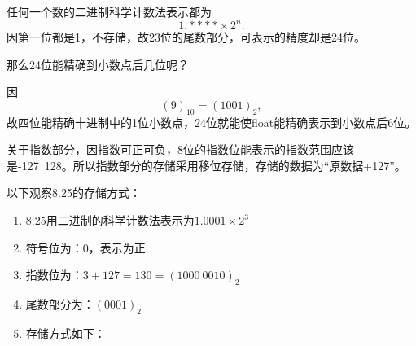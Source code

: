 %
\begin{frame}
\textcolor{acolor5}{任何一个数的二进制科学计数法表示都为
$$
1.****\times 2^n.
$$
因第一位都是1，不存储，故23位的尾数部分，可表示的精度却是24位。 
} 
\end{frame}
%
\begin{frame}
 
\begin{wenti}
那么24位能精确到小数点后几位呢？ 
\end{wenti}
因$$
(9)_{10}=(1001)_2,
$$
故四位能精确十进制中的1位小数点，24位就能使float能精确表示到小数点后6位。
\end{frame}
%
\begin{frame}
关于指数部分，因指数可正可负，8位的指数位能表示的指数范围应该是-127~128。所以指数部分的存储采用移位存储，存储的数据为“原数据+127”。
\end{frame}
%
\begin{frame}
以下观察8.25的存储方式： 

\begin{enumerate}
\item $8.25$用二进制的科学计数法表示为$1.0001\times2^3$\\[0.1in] \pause 
\item 符号位为：0，表示为正
\item[] 指数位为：$3+127=130=(1000~0010)_2$
\item[] 尾数部分为：$(0001)_2$\\[0.1in]\pause 
\item 存储方式如下：
\begin{figure}
\centering
{}
\end{figure}
\end{enumerate}
\end{frame}

